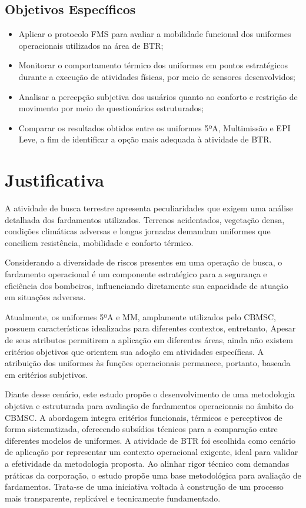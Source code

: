 		\subsection{Objetivos Específicos}
			\begin{itemize}
				\item Aplicar o protocolo \acrfull{FMS} para avaliar a mobilidade funcional dos uniformes operacionais utilizados na área de \acrlong{BTR};
				\item Monitorar o comportamento térmico dos uniformes em pontos estratégicos durante a execução de atividades físicas, por meio de sensores desenvolvidos;
				\item Analisar a percepção subjetiva dos usuários quanto ao conforto e restrição de movimento por meio de questionários estruturados;
				\item Comparar os resultados obtidos entre os uniformes 5ºA, Multimissão e \acrshort{EPI} Leve, a fim de identificar a opção mais adequada à atividade de \acrlong{BTR}.
			\end{itemize}

\section{Justificativa}
	
	A atividade de busca terrestre apresenta peculiaridades que exigem uma análise detalhada dos 
	fardamentos utilizados. Terrenos acidentados, vegetação densa, condições climáticas adversas 
	e longas jornadas demandam uniformes que conciliem resistência, mobilidade e conforto térmico.
	
	Considerando a diversidade de riscos presentes em uma operação de busca, o fardamento operacional é um componente estratégico para
	 a segurança e eficiência dos bombeiros, influenciando diretamente sua capacidade de atuação em situações adversas.
	
	Atualmente, os uniformes 5ºA e \acrlong{MM}, amplamente utilizados pelo \acrshort{CBMSC}, possuem 
	características idealizadas para diferentes contextos,
	  entretanto, Apesar de seus atributos permitirem a aplicação em diferentes áreas, ainda não existem critérios objetivos que 
	  orientem sua adoção em atividades específicas. A atribuição dos uniformes às funções operacionais 
	  permanece, portanto, baseada em critérios subjetivos.
	
	  Diante desse cenário, este estudo propõe o desenvolvimento de uma metodologia objetiva e estruturada
	   para avaliação de fardamentos operacionais no âmbito do \acrshort{CBMSC}. A abordagem integra 
	   critérios funcionais, térmicos e perceptivos de forma sistematizada, oferecendo subsídios técnicos para 
	   a comparação entre diferentes modelos de uniformes. A atividade de \acrlong{BTR} foi escolhida 
	   como cenário de aplicação por representar um contexto operacional exigente, ideal para validar a 
	   efetividade da metodologia proposta. Ao alinhar rigor técnico com demandas práticas da corporação, 
	   o estudo propõe uma base metodológica para avaliação de fardamentos. Trata-se de uma iniciativa 
	   voltada à construção de um processo mais transparente, replicável e tecnicamente fundamentado.
